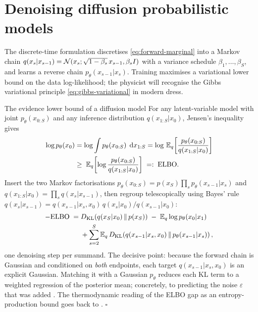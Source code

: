 \section{Denoising diffusion probabilistic models}\label{sec:ddpm}

The discrete-time formulation \citep{sohl2015deep, ho2020denoising}
discretises \eqref{eq:forward-marginal} into a Markov chain
$q(x_s | x_{s-1}) = \mathcal{N}(x_s; \sqrt{1 - \beta_s}\, x_{s-1}, \beta_s I)$
with a variance schedule $\beta_1, \dots, \beta_S$, and learns a reverse
chain $p_\theta(x_{s-1} | x_s)$. Training maximises a variational lower
bound on the data log-likelihood; the physicist will recognise the Gibbs
variational principle \eqref{eq:gibbs-variational} in modern dress.

\begin{toolbox}{The evidence lower bound of a diffusion model}
For any latent-variable model with joint $p_\theta(x_{0:S})$ and any
inference distribution $q(x_{1:S} | x_0)$, Jensen's inequality gives
\begin{align*}
  \log p_\theta(x_0)
  &= \log \int p_\theta(x_{0:S})\;\,\mathrm{d} x_{1:S}
   = \log\, \mathbb{E}_{q}\!\left[
      \frac{p_\theta(x_{0:S})}{q(x_{1:S}|x_0)} \right] \\
  &\geq\; \mathbb{E}_{q}\!\left[
      \log \frac{p_\theta(x_{0:S})}{q(x_{1:S}|x_0)} \right]
  \;=:\; \mathrm{ELBO}.
\end{align*}
Insert the two Markov factorisations
$p_\theta(x_{0:S}) = p(x_S) \prod_s p_\theta(x_{s-1}|x_s)$ and
$q(x_{1:S}|x_0) = \prod_s q(x_s|x_{s-1})$, then regroup telescopically
using Bayes' rule
$q(x_s|x_{s-1}) = q(x_{s-1}|x_s, x_0)\, q(x_s|x_0) / q(x_{s-1}|x_0)$:
\begin{align*}
  -\mathrm{ELBO}
  \;=\;& D_{\mathrm{KL}}\!\left(q(x_S|x_0) \,\|\, p(x_S)\right)
  \;-\; \mathbb{E}_q \log p_\theta(x_0 | x_1) \\
  &+ \sum_{s=2}^{S}
    \mathbb{E}_q\, D_{\mathrm{KL}}\!\left(q(x_{s-1}|x_s, x_0) \,\|\, p_\theta(x_{s-1}|x_s)\right) ,
\end{align*}
one denoising step per summand. The decisive point: because the forward
chain is Gaussian and conditioned on \emph{both} endpoints, each target
$q(x_{s-1} | x_s, x_0)$ is an explicit Gaussian. Matching it with a
Gaussian $p_\theta$ reduces each KL term to a weighted regression of the
posterior mean; concretely, to predicting the noise $\varepsilon$ that
was added \citep{ho2020denoising}. The thermodynamic reading of the ELBO
gap as an entropy-production bound goes back to \citet{sohl2015deep}.
\hfill$\square$
\end{toolbox}

